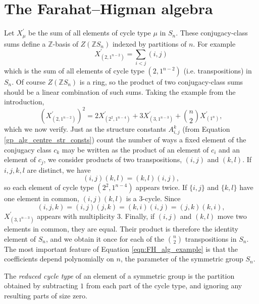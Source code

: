 \documentclass[ALCO,Unicode]{cedram}
\begin{document}
\section{The Farahat--Higman algebra} \label{FH_theory_section}

Let $X_{\mu}^\prime$ be the sum of all elements of cycle type $\mu$ in $S_n$. These conjugacy-class sums define a $\mathbb{Z}$-basis of $Z(\mathbb{Z}S_n)$ indexed by partitions of $n$. For example
\[
X_{(2,1^{n-2})}^\prime = \sum_{i<j} (i,j)
\]
which is the sum of all elements of cycle type $(2,1^{n-2})$ (i.e. transpositions) in $S_n$. Of course $Z(\mathbb{Z}S_n)$ is a ring, so the product of two conjugacy-class sums should be a linear combination of such sums. Taking the example from the introduction,
\begin{equation} \label{eqn:FH_alg_example}
(X_{(2,1^{n-2})}^\prime)^2 = 2X_{(2^2,1^{n-4})}^\prime + 3X_{(3,1^{n-3})}^\prime + \binom{n}{2}X_{(1^{n})}^\prime,
\end{equation}
which we now verify. Just as the structure constants $A_{i,j}^k$ (from Equation \eqref{gp_alg_centre_str_consts}) count the number of ways a fixed element of the conjugacy class $c_k$ may be written as the product of an element of $c_i$ and an element of $c_j$, we consider products of two transpositions, $(i,j)$ and $(k,l)$. 
If $i,j,k,l$ are distinct, we have
\[
(i,j)(k,l) = (k,l)(i,j),
\]
so each element of cycle type $(2^2,1^{n-4})$ appears twice. If $\{i,j\}$ and $\{k,l\}$ have one element in common, $(i,j)(k,l)$ is a 3-cycle. Since
\[
(i,j,k) = (i,j)(j,k) = (k,i)(i,j) = (j,k)(k,i),
\]
$X_{(3,1^{n-3})}^\prime$ appears with multiplicity 3. Finally, if $(i,j)$ and $(k,l)$ move two elements in common, they are equal. 
Their product is therefore the identity element of $S_n$, and we obtain it once for each of the $\binom{n}{2}$ transpositions in $S_n$. The most important feature of Equation \eqref{eqn:FH_alg_example} is that the coefficients depend polynomially on $n$, the parameter of the symmetric group $S_n$. 
\begin{definition}
The \emph{reduced cycle type} of an element of a symmetric group is the partition obtained by subtracting $1$ from each part of the cycle type, and ignoring any resulting parts of size zero. 
\end{definition}
\end{document}
